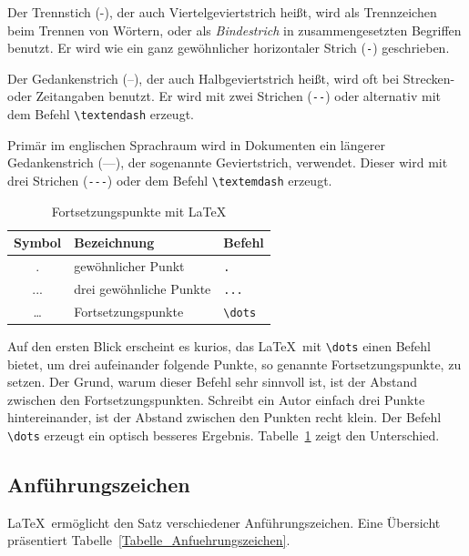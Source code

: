 Der Trennstich (-), der auch Viertelgeviertstrich heißt, wird als Trennzeichen beim Trennen von Wörtern, oder als \textsl{Bindestrich} in zusammengesetzten Begriffen benutzt. Er wird wie ein ganz gewöhnlicher horizontaler Strich (\texttt{-}) geschrieben.

Der Gedankenstrich (--), der auch Halbgeviertstrich heißt, wird oft bei Strecken- oder Zeitangaben benutzt. Er wird mit zwei Strichen (\texttt{-{}-}) oder alternativ mit dem Befehl \verb!\textendash! erzeugt.

Primär im englischen Sprachraum wird in Dokumenten ein längerer 
Gedankenstrich (---), der sogenannte Geviertstrich, verwendet. Dieser wird mit drei Strichen (\texttt{-{}-{}-}) oder dem Befehl \verb!\textemdash! erzeugt. 

\begin{table}[h!tb]
	\centering
	\caption{Fortsetzungspunkte mit \LaTeX}
	\label{Tabelle_Horizontale_Punkte}       %
	\begin{tabular}{cll}
		\hline
		Symbol & Bezeichnung & Befehl \\ 
		\hline
		. & gewöhnlicher Punkt & \texttt{.} \\
		... & drei gewöhnliche Punkte & \texttt{...} \\
		\dots & Fortsetzungspunkte & \texttt{\textbackslash dots}  \\
		\hline
	\end{tabular}
\end{table}


Auf den ersten Blick erscheint es kurios, das \LaTeX\ mit \verb!\dots! einen Befehl bietet, um drei aufeinander folgende Punkte, so genannte Fortsetzungspunkte, zu setzen. Der Grund, warum dieser Befehl sehr sinnvoll ist, ist der Abstand zwischen den Fortsetzungspunkten. Schreibt ein Autor einfach drei Punkte hintereinander, ist der Abstand zwischen den Punkten recht klein. Der Befehl \verb!\dots! erzeugt ein optisch besseres Ergebnis. Tabelle~\ref{Tabelle_Horizontale_Punkte} zeigt den Unterschied. 



\subsection{Anführungszeichen}

\LaTeX\ ermöglicht den Satz verschiedener Anführungszeichen. Eine Übersicht präsentiert Tabelle~\ref{Tabelle_Anfuehrungszeichen}. 

